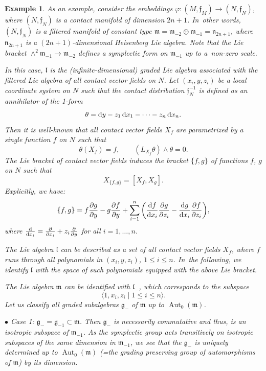 \documentclass[10pt,a4paper]{amsart}
\newcommand{\f}{\mathfrak f}
\newcommand{\g}{\mathfrak g}
\newcommand{\lf}{\mathfrak l}
\newcommand{\m}{\mathfrak m}
\newcommand{\n}{\mathfrak n}
\newcommand{\Aut}{\operatorname{Aut}}
\newtheorem{ex}[thm]{Example}
\numberwithin{equation}{section}
\begin{document}
\begin{ex}
	As an example, consider the embeddings $\varphi\colon (M,\f_M)\to (N,\f_N)$, where $(N,\f_N)$ is a contact manifold of dimension $2n+1$. In~other words, $(N,\f_N)$ is a filtered manifold of constant type $\m=\m_{-2}\oplus\m_{-1}=\n_{2n+1}$, where $\n_{2n+1}$ is a $(2n+1)$-dimensional Heisenberg Lie algebra. Note that the Lie bracket $\wedge^2 \m_{-1}\to \m_{-2}$ defines a symplectic form on $\m_{-1}$ up to a~non-zero scale.
	
	In this case, $\lf$ is the (infinite-dimensional) graded Lie algebra associated with the filtered Lie algebra of all contact vector fields on $N$. Let $(x_i,y,z_i)$ be a local coordinate system on $N$ such that the contact distribution $\f_{N}^{-1}$ is defined as an annihilator of the 1-form
	\[
	\theta = {\rm d}y - z_1\,{\rm d}x_1 - \dots - z_n\,{\rm d}x_n.
	\]
	Then it is well-known that all contact vector fields $X_f$ are parametrized by a single function $f$ on $N$ such that
	\[
	\theta(X_f)=f,\qquad (L_{X_f} \theta)\wedge \theta = 0.
	\]
	The Lie bracket of contact vector fields induces the bracket $\{f,g\}$ of functions $f$, $g$ on $N$ such that
	\[
	X_{\{f,g\}} = [X_f,X_g].
	\]
	Explicitly, we have:
	\[
	\{f,g\} = f\frac{\partial g}{\partial y} - g\frac{\partial f}{\partial y} +
	\sum_{i=1}^n \bigg(\frac{{\rm d}f}{{\rm d}x_i}\frac{\partial g}{\partial z_i} - \frac{{\rm d}g}{{\rm d}x_i}\frac{\partial f}{\partial z_i} \bigg),
	\]
	where $\frac{\rm d}{{\rm d}x_i} = \frac{\partial}{\partial x_i} + z_i \frac{\partial}{\partial y}$
for all $i=1,\dots, n$.
	
	The Lie algebra $\lf$ can be described as a set of all contact vector fields $X_f$, where $f$ runs through all polynomials in $(x_i,y,z_i)$, $1\le i\le n$. In~the following, we identify $\lf$ with the space of such polynomials equipped with the above Lie bracket.
	
	The Lie algebra $\m$ can be identified with $\lf_{-}$, which corresponds to the subspace
	\[
	\langle 1, x_i, z_i\mid 1\le i \le n \rangle.
	\]
	Let us classify all graded subalgebras $\g_{-}$ of $\m$ up to $\Aut_0(\m)$.
	
$\bullet$ {\it Case} 1: $\g_{-}=\g_{-1}\subset \m$. Then $\g_{-}$ is necessarily commutative and thus, is an isotropic subspace of $\m_{-1}$. As the symplectic group acts transitively on isotropic subspaces of the same dimension in $\m_{-1}$, we see that the $\g_{-}$ is uniquely determined up to $\Aut_0(\m)$ (=the grading preserving group of automorphisms of $\m$) by its dimension.
	

\end{ex}
\end{document}

